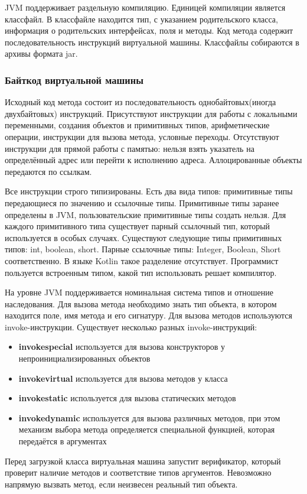 \documentclass{spbau-diploma}
\begin{document}
JVM поддерживает раздельную компиляцию. Единицей компиляции является классфайл. В классфайле находится тип, с указанием родительского класса, информация о родительских интерфейсах, поля и методы. Код метода содержит последовательность инструкций виртуальной машины. Классфайлы собираются в архивы формата jar.

\subsubsection{Байткод виртуальной машины}
Исходный код метода состоит из последовательность однобайтовых(иногда двухбайтовых) инструкций. Присутствуют инструкции для работы с локальными переменными, создания объектов и примитивных типов, арифметические операции, инструкции для вызова метода, условные переходы. Отсутствуют инструкции для прямой работы с памятью: нельзя взять указатель на определённый адрес или перейти к исполнению адреса. Аллоцированные объекты передаются по ссылкам.

Все инструкции строго типизированы. Есть два вида типов: примитивные типы передающиеся по значению и ссылочные типы. Примитивные типы заранее определены в JVM, пользовательские примитивные типы создать нельзя. Для каждого примитивного типа существует парный ссылочный тип, который используется в особых случаях. Существуют следующие типы примитивных типов: int, boolean, short. Парные ссылочные типы: Integer, Boolean, Short соответственно. В языке Kotlin такое разделение отсутствует. Программист пользуется встроенным типом, какой тип использовать решает компилятор.

На уровне JVM поддерживается номинальная система типов и отношение наследования. Для вызова метода необходимо знать тип объекта, в котором находится поле, имя метода и его сигнатуру. Для вызова методов используются invoke-инструкции. Существует несколько разных invoke-инструкций:
\begin{itemize}
    \item \textbf{invokespecial} используется для вызова конструкторов у непроинициализированных объектов
    \item \textbf{invokevirtual} используется для вызова методов у класса
    \item \textbf{invokestatic} используется для вызова статических методов
    \item \textbf{invokedynamic} используется для вызова различных методов, при этом механизм выбора метода определяется специальной функцией, которая передаётся в аргументах
\end{itemize}
Перед загрузкой класса виртуальная машина запустит верификатор, который проверит наличие методов и соответствие типов аргументов. Невозможно напрямую вызвать метод, если неизвесен реальный тип объекта.
\end{document}
